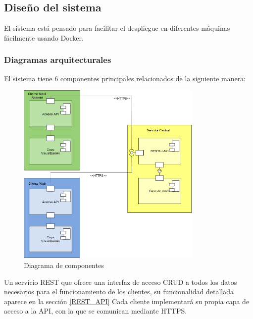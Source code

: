 \documentclass{article}
\begin{document}
\subsection{Diseño del sistema}


El sistema está pensado para facilitar el despliegue en diferentes máquinas
fácilmente usando Docker.

\subsubsection{Diagramas arquitecturales}

El sistema tiene 6 componentes principales relacionados de la siguiente manera:
\begin{figure}[htb]
    \centering
    \includegraphics[width=0.8\textwidth]{./images/diagrama_componentes.png}
    \caption{Diagrama de componentes}
    \label{fig:diag_componentes}
\end{figure}

Un servicio REST que ofrece una interfaz de acceso CRUD a todos los datos necesarios para
el funcionamiento de los clientes, su funcionalidad detallada aparece en la sección \ref{REST_API}
Cada cliente implementará su propia capa de acceso a la API, con la que se comunican mediante
HTTPS.
\end{document}

